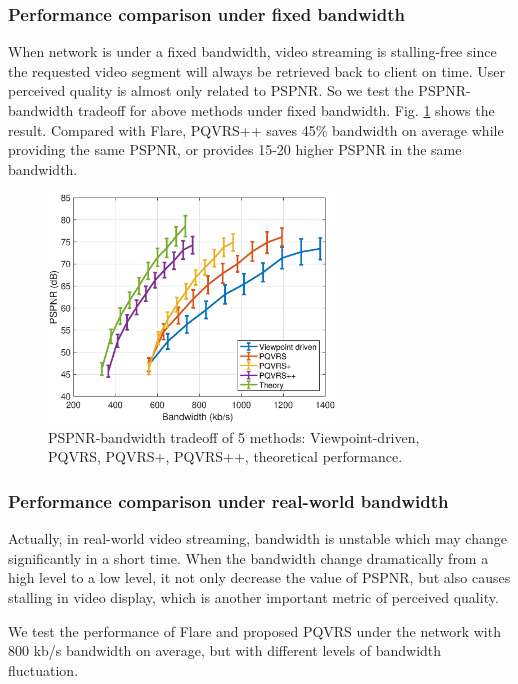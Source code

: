 \subsubsection{Performance comparison under fixed bandwidth}

When network is under a fixed bandwidth, video streaming is stalling-free since the requested video segment will always be retrieved back to client on time. User perceived quality is almost only related to PSPNR. So we test the PSPNR-bandwidth tradeoff for above methods under fixed bandwidth. Fig. \ref{practical_imp} shows the result. Compared with Flare, PQVRS++ saves 45\% bandwidth on average while providing the same PSPNR, or provides 15-20 higher PSPNR in the same bandwidth.

  \begin{figure}
  \centering
  \includegraphics[width=3in]{images/practical_improvement.eps}
  \caption{PSPNR-bandwidth tradeoff of 5 methods: Viewpoint-driven, PQVRS, PQVRS+, PQVRS++, theoretical performance.}
  \label{practical_imp}
  \end{figure}

\subsubsection{Performance comparison under real-world bandwidth}

Actually, in real-world video streaming, bandwidth is unstable which may change significantly in a short time. When the bandwidth change dramatically from a high level to a low level, it not only decrease the value of PSPNR, but also causes stalling in video display, which is another important metric of perceived quality.

We test the performance of Flare and proposed PQVRS under the network with 800 kb/s bandwidth on average, but with different levels of bandwidth fluctuation. 

